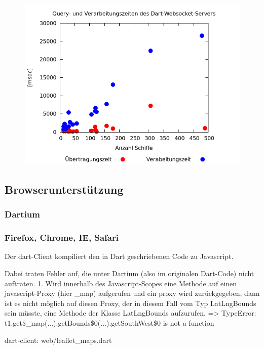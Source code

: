 \begin {figure}[H]
\begin{center}
  \includegraphics[width=5in]{images/dart.png}
\end{center}
\end {figure}


\subsection{Browserunterstützung}
\subsubsection{Dartium}

\subsubsection{Firefox, Chrome, IE, Safari}

Der dart-Client kompiliert den in Dart geschriebenen Code zu Javascript.

Dabei traten Fehler auf, die unter Dartium (also im originalen Dart-Code) nicht auftraten.
1. Wird innerhalb des Javascript-Scopes eine Methode auf einen javascript-Proxy (hier \_map) aufgerufen und ein proxy wird zurückgegeben, dann ist es nicht möglich auf diesen Proxy, der in diesem Fall vom Typ LatLngBounds sein müsste, eine Methode der Klasse LatLngBounds aufzurufen. => TypeError: t1.get\$\_map(...).getBounds\$0(...).getSouthWest\$0 is not a function

dart-client: web/leaflet\_maps.dart

